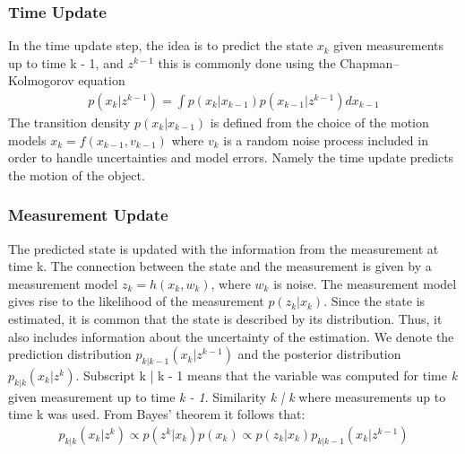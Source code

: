 \begin{itemize}
                    \subsubsection{Time Update}
                        In the time update step, the idea is to predict the state \textbf{$x_k$} given measurements up to time k - 1, and \emph{$z^{k-1}$} this is commonly done using the Chapman–Kolmogorov equation
                        \begin{align}
                            p(x_k | z^{k-1}) = \int p(x_k | x_{k-1}) p(x_{k-1} | z^{k-1}) d x_{k-1}
                        \end{align} 
                        The transition density \emph{$p(x_k | x_{k-1})$} is defined from the choice of the motion models \textbf{$x_k = f(x_{k-1}, v_{k-1})$} where \emph{$v_k$} is a random noise process included in order to handle 
                        uncertainties and model errors. Namely the time update predicts the motion of the object.
                    \subsubsection{Measurement Update}
                        The predicted state is updated with the information from the measurement at time k. The connection between the state and the measurement is given by a measurement model \emph{$z_k = h(x_k,w_k)$}, where \emph{$w_k$} is noise. 
                        The measurement model gives rise to the likelihood of the measurement \emph{$p(z_k | x_k)$}. Since the state is estimated, it is common that the state is described by its distribution. Thus, it also includes information about 
                        the uncertainty of the estimation. We denote the prediction distribution \emph{$p_{k | k-1}(x_k | z^{k-1})$} and the posterior distribution \emph{$p_{k | k}(x_k | z^{k})$}. Subscript k | k - 1 means that the variable was 
                        computed for time \emph{k} given measurement up to time \emph{k - 1}. Similarity \emph{k | k} where measurements up to time k was used. From Bayes' theorem it follows that:
                        \begin{align}
                            p_{k|k} (x_k|z^k) \propto p(z^k|x_k) p(x_k) \propto p(z_k|x_k) p_{k|k-1} (x_k|z^{k-1})
                        \end{align}

\end{itemize}
